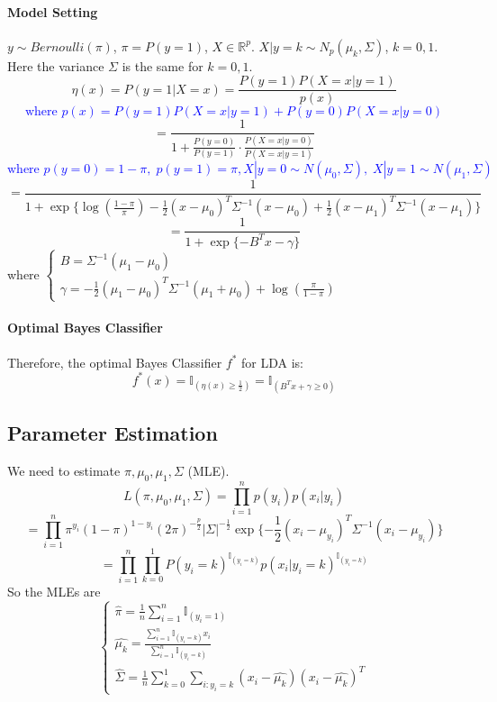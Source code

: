 \documentclass[12pt]{book}
\theoremstyle{definition}
\theoremstyle{remark}
\newcommand{\R}{\mathbb{R}}
\begin{document}
\paragraph{Model Setting} $y \sim Bernoulli(\pi)$, $\pi = P(y = 1)$, $X \in \R^p$. $X|y = k \sim N_p(\mu_k, \Sigma)$, $k = 0,1$. Here the variance $\Sigma$ is the same for $k = 0,1$.
\[\eta(x) = P(y=1|X=x) = \frac{P(y=1)P(X=x|y=1)}{p(x)}\]
\textcolor{blue}{
\[\text{where  } p(x) = P(y=1)P(X=x|y=1)+P(y=0)P(X=x|y=0)\]}
\[ = \frac{1}{1+\frac{P(y=0)}{P(y=1)}\cdot\frac{P(X=x|y=0)}{P(X=x|y=1)}}\]\textcolor{blue}{
\[\text{where } p(y = 0) = 1-\pi, \; p(y=1) = \pi, X|y=0\sim N(\mu_0,\Sigma),\;X|y=1 \sim N(\mu_1,\Sigma)\]}
\[ = \frac{1}{1+\exp\{\log(\frac{1-\pi}{\pi}) - \frac12 (x-\mu_0)^T\Sigma^{-1}(x-\mu_0)+\frac12 (x-\mu_1)^T\Sigma^{-1}(x-\mu_1)\}}\]
\[ = \frac{1}{1+\exp\{-B^Tx-\gamma\}}\]
where $\begin{cases}B = \Sigma^{-1}(\mu_1 - \mu_0)
 \\\gamma = -\frac12(\mu_1 - \mu_0)^T\Sigma^{-1}(\mu_1+\mu_0)+\log(\frac{\pi}{1-\pi})
\end{cases}$\\
\paragraph{Optimal Bayes Classifier}
Therefore, the optimal Bayes Classifier $f^*$ for LDA is:
\[f^*(x) = \mathbb{I}_{(\eta(x)\ge \frac12)} = \mathbb{I}_{(B^Tx+\gamma\ge0)}\]


\subsection{Parameter Estimation}
We need to estimate $\pi, \mu_0,\mu_1,\Sigma$ (MLE).\\
\[L(\pi,\mu_0,\mu_1,\Sigma) = \prod_{i=1}^np(y_i)p(x_i|y_i)\]
\[ = \prod_{i=1}^n\pi^{y_i}(1-\pi)^{1-y_i}(2\pi)^{-\frac p2}|\Sigma|^{-\frac12}\exp\{-\frac12 (x_i-\mu_{y_i})^T\Sigma^{-1}(x_i-\mu_{y_i})\}\]
\[ = \prod_{i=1}^n\prod_{k=0}^1P(y_i = k)^{\mathbb{I}_{(y_i = k)}}p(x_i|y_i = k)^{\mathbb{I}_{(y_i = k)}}\]
So the MLEs are
\[\begin{cases}\hat{\pi} = \frac1n \sum_{i=1}^n \mathbb{I}_{(y_i = 1)}
 \\\hat{\mu_k} = \frac{\sum_{i=1}^n \mathbb{I}_{(y_i = k)}x_i}{\sum_{i=1}^n\mathbb{I}_{(y_i = k)}}
 \\\hat{\Sigma} = \frac1n \sum_{k=0}^1\sum_{i:y_i = k}(x_i - \hat{\mu_k})(x_i - \hat{\mu_k})^T
\end{cases}\]
\end{document}
